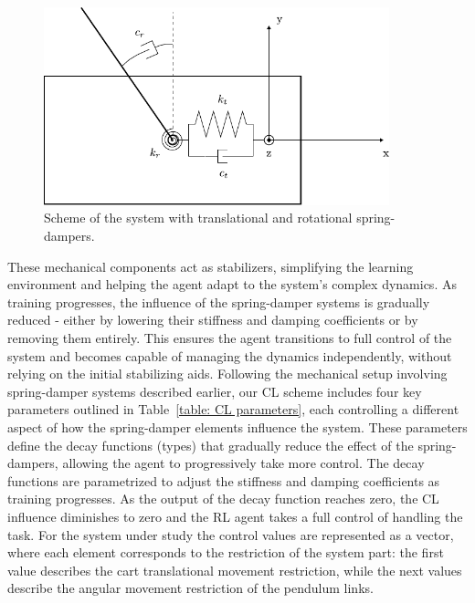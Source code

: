 \begin{figure}[h]
	\centering
	\includegraphics[width=10cm]{Figures/cl_mech_implementation_v1.pdf}
	\caption{Scheme of the system with translational and rotational spring-dampers. }
	\label{fig: cl mechanical implementation}
\end{figure}

These mechanical components act as stabilizers, simplifying the learning environment and helping the agent adapt to the system's complex dynamics. As training progresses, the influence of the spring-damper systems is gradually reduced - either by lowering their stiffness and damping coefficients or by removing them entirely. This ensures the agent transitions to full control of the system and becomes capable of managing the dynamics independently, without relying on the initial stabilizing aids.
Following the mechanical setup involving spring-damper systems described earlier, our CL scheme includes four key parameters outlined in Table~\ref{table: CL parameters}, each controlling a different aspect of how the spring-damper elements influence the system. These parameters define the decay functions (types) that gradually reduce the effect of the spring-dampers, allowing the agent to progressively take more control. The decay functions are parametrized to adjust the stiffness and damping coefficients as training progresses. As the output of the decay function reaches zero, the CL influence diminishes to zero and the RL agent takes a full control of handling the task. For the system under study the control values are represented as a vector, where each element corresponds to the restriction of the system part: the first value describes the cart translational movement restriction, while the next values describe the angular movement restriction of the pendulum links. 

